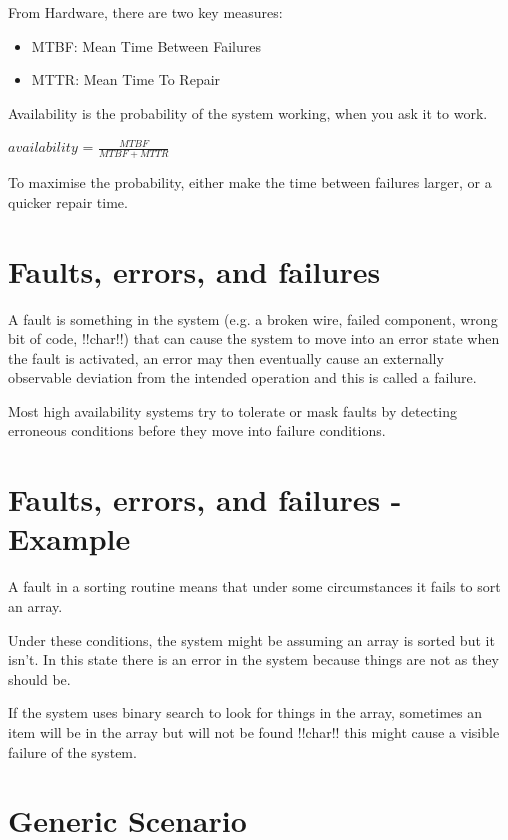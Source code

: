 \documentclass[a4paper]{report}
\begin{document}
From Hardware, there are two key measures:
\begin{itemize}
\item{MTBF: Mean Time Between Failures}
\item{MTTR: Mean Time To Repair}
\end{itemize}
Availability is the probability of the system working, when you ask it to work.\newline

$\textit{availability = }\frac{MTBF}{MTBF+MTTR}$\newline

To maximise the probability, either make the time between failures larger, or a quicker repair time.
\newline
\section{Faults, errors, and failures}
A fault is something in the system (e.g. a broken wire, failed component, wrong bit of code, !!char!!)	that can cause the system to move into an error	state when the fault is activated, an error may then eventually cause an externally observable deviation from the intended operation and this is called a failure.\newline

Most high availability systems try to tolerate or mask faults by detecting erroneous conditions before they move into failure	conditions. 

\section{Faults, errors, and failures - Example}
A fault in a sorting routine means that under some circumstances it fails to sort an array.\newline

Under these conditions, the system might be assuming an array is sorted but it isn't.  In this state there is an error in the system because things are not as they should be.\newline

If the system uses binary search to look for things in the array, sometimes an item will be in the array but will not be found !!char!! this might cause a visible failure  of the system.

\section{Generic Scenario}
\end{document}
